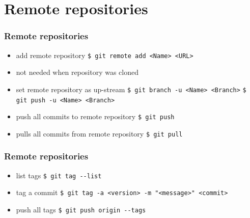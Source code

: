 \documentclass{beamer}
\begin{document}
	\section{Remote repositories}
	\begin{frame}
		\frametitle{Remote repositories}\pause
		\begin{itemize}
			\item add remote repository\newline
			\lstinline|$ git remote add <Name> <URL>| \pause
			\item not needed when repository was cloned \pause
			\item set remote repository as up-stream\newline
			\lstinline|$ git branch -u <Name> <Branch>|\newline
			\lstinline|$ git push -u <Name> <Branch>| \pause
			\item push all commits to remote repository\newline
			\lstinline|$ git push| \pause
			\item pulls all commits from remote repository\newline
			\lstinline|$ git pull| 
		\end{itemize}
	\end{frame}

	\begin{frame}
		\frametitle{Remote repositories}\pause
		\begin{itemize}
			\item list tags\newline
			\lstinline|$ git tag --list| \pause
			\item tag a commit\newline
			\lstinline|$ git tag -a <version> -m "<message>" <commit>| \pause
			\item push all tags\newline
			\lstinline|$ git push origin --tags|
		\end{itemize}
	\end{frame}
	
\end{document}
